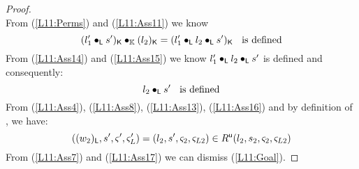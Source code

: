 \begin{lemma}[]
\begin{proof}
\begin{equation}
\end{equation}
%
From (\ref{L11:Perms}) and (\ref{L11:Ass11}) we know
%
\begin{equation}
	(l'_1 \bullet_{\textsf{L}} s')_{\textsf{K}} \bullet_{\mathbb{K}} (l_2)_{\textsf{K}} = (l'_1 \bullet_{\textsf{L}} l_2 \bullet_{\textsf{L}} s')_{\textsf{K}}\hspace*{0.2cm}\text{ is defined} \label{L11:Ass15}
\end{equation}
%
From (\ref{L11:Ass14}) and (\ref{L11:Ass15}) we know $l'_1 \bullet_{\textsf{L}} l_2 \bullet_{\textsf{L}} s'$ is defined and consequently:
%
\begin{equation}
	l_2 \bullet_{\textsf{L}} s' \hspace*{0.2cm} \text{ is defined} \label{L11:Ass16}
\end{equation}
%
From (\ref{L11:Ass4}), (\ref{L11:Ass8}), (\ref{L11:Ass13}), (\ref{L11:Ass16}) and by definition of \updateR, we have:
%
\begin{equation}
	((w_2)_{\textsf{L}}, s', \varsigma_{}', \varsigma_{L}') = (l_2, s', \varsigma_{2}, \varsigma_{L2}) \in R^{\textsf{u}}(l_2, s_2, \varsigma_{2}, \varsigma_{L2})  \label{L11:Ass17}
\end{equation}
%
From (\ref{L11:Ass7}) and (\ref{L11:Ass17}) we can dismiss (\ref{L11:Goal}).
\end{proof}
%
\end{lemma}
%
%
